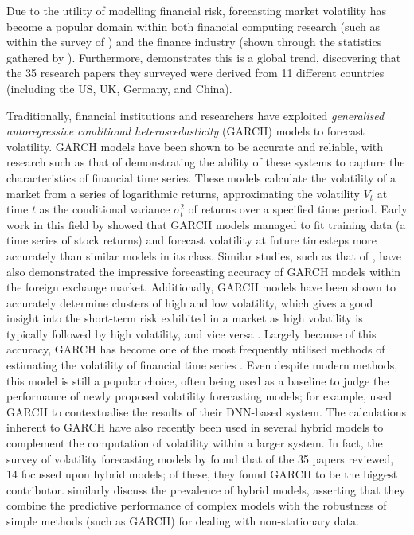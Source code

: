 \documentclass[a4paper, 11pt]{report}
\begin{document}
    Due to the utility of modelling financial risk, forecasting market volatility has become a popular domain within both financial computing research (such as within the survey of \citet{ozbayoglu-2020}) and the finance industry (shown through the statistics gathered by \citet{chartis-2019}). Furthermore, \citet{ge-2022} demonstrates this is a global trend, discovering that the 35 research papers they surveyed were derived from 11 different countries (including the US, UK, Germany, and China).

    Traditionally, financial institutions and researchers have exploited \emph{generalised autoregressive conditional heteroscedasticity} (GARCH) models to forecast volatility. GARCH models have been shown to be accurate and reliable, with research such as that of \citet{lahmiri-2017} demonstrating the ability of these systems to capture the characteristics of financial time series. These models calculate the volatility of a market from a series of logarithmic returns, approximating the volatility $V_t$ at time $t$ as the conditional variance $\sigma_{t}^2$ of returns over a specified time period. Early work in this field by \citet{akgiray-1989} showed that GARCH models managed to fit training data (a time series of stock returns) and forecast volatility at future timesteps more accurately than similar models in its class. Similar studies, such as that of \citet{hansen-2005}, have also demonstrated the impressive forecasting accuracy of GARCH models within the foreign exchange market. Additionally, GARCH models have been shown to accurately determine clusters of high and low volatility, which gives a good insight into the short-term risk exhibited in a market as high volatility is typically followed by high volatility, and vice versa \citep{arum-2019}. Largely because of this accuracy, GARCH has become one of the most frequently utilised methods of estimating the volatility of financial time series \citep{cheng-2003}. Even despite modern methods, this model is still a popular choice, often being used as a baseline to judge the performance of newly proposed volatility forecasting models; for example, \citet{rodikov-2022} used GARCH to contextualise the results of their DNN-based system. The calculations inherent to GARCH have also recently been used in several hybrid models to complement the computation of volatility within a larger system. In fact, the survey of volatility forecasting models by \citet{ge-2022} found that of the 35 papers reviewed, 14 focussed upon hybrid models; of these, they found GARCH to be the biggest contributor. \citet{tino-2001} similarly discuss the prevalence of hybrid models, asserting that they combine the predictive performance of complex models with the robustness of simple methods (such as GARCH) for dealing with non-stationary data.
\end{document}
